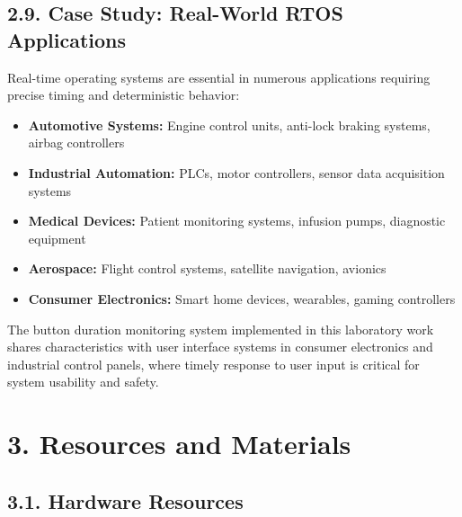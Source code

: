 \documentclass[12pt]{article}
\begin{document}
\subsection*{2.9. Case Study: Real-World RTOS Applications}

Real-time operating systems are essential in numerous applications requiring precise timing and deterministic behavior:

\begin{itemize}
    \item \textbf{Automotive Systems:} Engine control units, anti-lock braking systems, airbag controllers
    \item \textbf{Industrial Automation:} PLCs, motor controllers, sensor data acquisition systems
    \item \textbf{Medical Devices:} Patient monitoring systems, infusion pumps, diagnostic equipment
    \item \textbf{Aerospace:} Flight control systems, satellite navigation, avionics
    \item \textbf{Consumer Electronics:} Smart home devices, wearables, gaming controllers
\end{itemize}

The button duration monitoring system implemented in this laboratory work shares characteristics with user interface systems in consumer electronics and industrial control panels, where timely response to user input is critical for system usability and safety.

\section*{3. Resources and Materials}

\subsection*{3.1. Hardware Resources}
\end{document}
